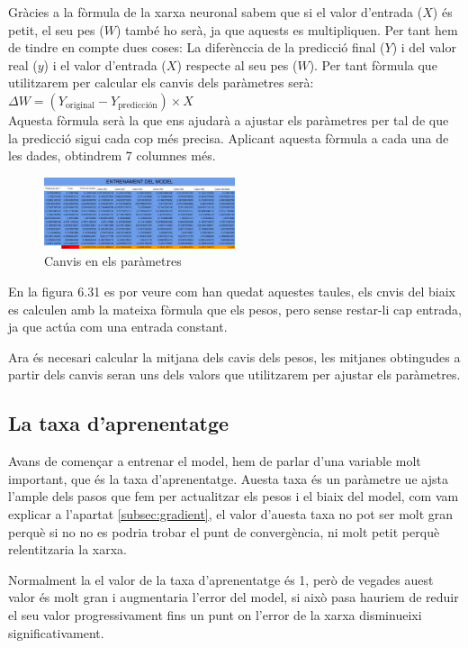 Gràcies a la fòrmula de la xarxa neuronal sabem que si el valor d'entrada ($X$) és petit, el seu pes ($W$) també ho serà, ja que aquests es multipliquen. Per tant hem de tindre en compte dues coses: La diferènccia de la predicció final ($Y$) i del valor real ($y$) i el valor d'entrada ($X$) respecte al seu pes ($W$). Per tant fòrmula que utilitzarem per calcular els canvis dels paràmetres serà:\\
$\Delta W = (Y_{\text{original}} - Y_{\text{predicción}}) \times X$\\
Aquesta fòrmula serà la que ens ajudarà a ajustar els paràmetres per tal de que la predicció sigui cada cop més precisa. Aplicant aquesta fòrmula a cada una de les dades, obtindrem 7 columnes més.

\begin{figure}[H]
    \centering
    \includegraphics[width=0.5\textwidth]{./figures/Canvis.png}
    \caption{Canvis en els paràmetres}
\end{figure}

En la figura 6.31 es por veure com han quedat aquestes taules, els cnvis del biaix es calculen amb la mateixa fòrmula que els pesos, pero sense restar-li cap entrada, ja que actúa com una entrada constant.

Ara és necesari calcular la mitjana dels cavis dels pesos, les mitjanes obtingudes a partir dels canvis seran uns dels valors que utilitzarem per ajustar els paràmetres.

\subsection{La taxa d'aprenentatge}
Avans de començar a entrenar el model, hem de parlar d'una variable molt important, que és la taxa d'aprenentatge. Auesta taxa és un paràmetre ue ajsta l'ample dels pasos que fem per actualitzar els pesos i el biaix del model, com vam explicar a l'apartat \ref{subsec:gradient}, el valor d'auesta taxa no pot ser molt gran perquè si no no es podria trobar el punt de convergència, ni molt petit perquè relentitzaria la xarxa.

Normalment la el valor de la taxa d'aprenentatge és 1, però de vegades auest valor és molt gran i augmentaria l'error del model, si això pasa hauriem de reduir el seu valor progressivament fins un punt on l'error de la xarxa disminueixi significativament.

